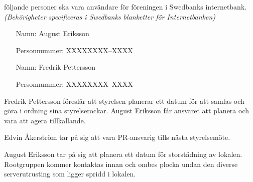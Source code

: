 \documentclass{protokoll}
\begin{document}
\begin{beslut}
    \att följande personer ska vara användare för föreningen i Swedbanks internetbank. \emph{(Behörigheter specificeras i Swedbanks blanketter för Internetbanken)}
    \begin{itemize}
        \item[Namn: ] August Eriksson
        \item[Personnummer: ] XXXXXXXX--XXXX

        \item[Namn: ] Fredrik Pettersson
        \item[Personnummer: ] XXXXXXXX--XXXX
    \end{itemize}
\end{beslut}

Fredrik Pettersson föreslår att styrelsen planerar ett datum för att samlas och göra i ordning sina styrelserockar. August Eriksson får ansvaret att planera och vara att agera tillkallande.

Edvin Åkerström tar på sig att vara PR-ansvarig tills nästa styrelsemöte.

August Eriksson tar på sig att planera ett datum för storstädning av lokalen. Rootgruppen kommer kontaktas innan och ombes plocka undan den diverse serverutrusting som ligger spridd i lokalen.
\end{document}
